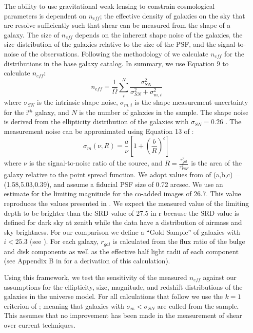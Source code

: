 \documentclass[11pt]{article}
\begin{document}
The ability to use gravitational weak lensing to constrain
cosmological parameters is dependent on $n_{eff}$; the effective
density of galaxies on the sky that are resolve sufficiently such that
shear can be measured from the shape of a galaxy. The size of
$n_{eff}$ depends on the inherent shape noise of the galaxies, the
size distribution of the galaxies relative to the size of the PSF, and
the signal-to-noise of the observations.  Following the methodology of
\citet{chang} we calculate $n_{eff}$ for the distributions in the base
galaxy catalog.  In summary, we use Equation 9 to calculate $n_{eff}$:
\begin{equation}
n_{eff} = \frac{1}{\Omega}\sum^N_i\frac{\sigma^2_{SN}}{\sigma^2_{SN}+\sigma^2_{m,i}}
\end{equation}
where $\sigma_{SN}$ is the intrinsic shape noise, $\sigma_{m,i}$ is
the shape measurement uncertainty for the i$^{th}$ galaxy, and $N$ is
the number of galaxies in the sample. The shape noise is derived from
the ellipticity distribution of the galaxies with $\sigma_{SN} = 0.26$
\citep{chang}.  The measurement noise can be approximated using
Equation 13 of \citet{chang}:
\begin{equation}
\sigma_m(\nu,R) = \frac{a}{\nu}\left[1+\left(\frac{b}{R}\right)^c\right]
\end{equation}
where $\nu$ is the signal-to-noise ratio of the source, and
$R=\frac{r_{gal}^2}{r_{PSF}^2}$ is the area of the galaxy relative to
the point spread function.  We adopt values from \citet{chang} of
(a,b,c) = (1.58,5.03,0.39), and assume a fiducial PSF size of 0.72
arcsec. We use an estimate for the limiting magnitude for the co-added
images of 26.7.  This value reproduces the values presented in
\citet{chang}.  We expect the measured value of the limiting depth to
be brighter than the SRD value of 27.5 in r because the SRD value is
defined for dark sky at zenith while the \citet{chang} data have a
distribution of airmass and sky brightness.  
For our comparison we define a ``Gold Sample'' of galaxies with $i <
25.3$ (see \citealt{LSSTScienceBook}).  For each galaxy, $r_{gal}$ is
calculated from the flux ratio of the bulge and disk components as
well as the effective half light radii of each component (see Appendix
B in \citet{chang} for a derivation of this calculation).

Using this framework, we test the sensitivity of the measured
$n_{eff}$ against our assumptions for the ellipticity, size,
magnitude, and redshift distributions of the galaxies in the universe
model.  For all calculations that follow we use the $k=1$ criterion of
\citet{chang}; meaning that galaxies with $\sigma_m < \sigma_{SN}$ are
culled from the sample. This assumes that no improvement has been made
in the measurement of shear over current techniques.  
\end{document}
